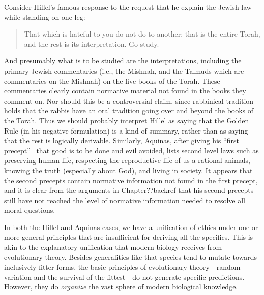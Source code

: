 Consider Hillel's famous response to the request that he explain the Jewish law while standing on one leg: 
\begin{quote}
That which is hateful to you do not do to another; that is the entire Torah, and the rest is its interpretation. Go study. \parencite[Shabbat 31a]{Bavli}
\end{quote}
And presumably what is to be studied are the interpretations, including the primary Jewish commentaries 
(i.e., the Mishnah, and the
Talmuds which are commentaries on the Mishnah) on the five books of the Torah. These commentaries clearly
contain normative material not found in the books they comment on. Nor should this be 
a controversial claim, since rabbinical tradition holds that the rabbis have an oral tradition going over and beyond the books of 
the Torah. Thus we should probably interpret Hillel as saying that the Golden Rule (in his negative formulation) is a kind of summary,
rather than as saying that the rest is logically derivable. Similarly, Aquinas, after giving his ``first precept''~\parencite[I-II.94.2]{AquinasST} that good is to be done and evil avoided, lists second level laws such as
preserving human life, respecting the reproductive life of us a rational animals, knowing the truth (especially about God), and living 
in society. It appears that the second precepts contain normative information not found in the first precept, and
it is clear from the arguments in Chapter??backref that his second precepts still have not reached the level of 
normative information needed to resolve all moral questions.

In both the Hillel and Aquinas cases, we have a unification of ethics under one or more general principles that are insufficient
for deriving all the specifics. This is akin to the explanatory unification that modern biology receives from evolutionary theory. 
Besides generalities like that species tend to mutate towards inclusively fitter forms, the basic principles of evolutionary theory---random 
variation and the survival of the fittest---do not generate specific predictions. However, they do \textit{organize} the vast sphere of modern
biological knowledge. 

